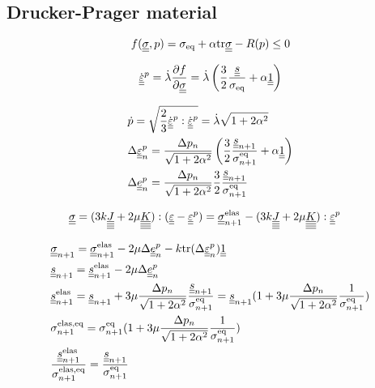 \documentclass[12pt]{article}
\begin{document}
\newpage
\begin{appendices}
    \section{Drucker-Prager material}

    \begin{equation}
        f(\uusigma, p) = \sigma_{\text{eq}} + \alpha \mtr \uusigma - R(p) \leq 0
    \end{equation}

    \begin{equation}
        \dot{\uueps}^p = \dot{\lambda} \frac{\partial f}{\partial \uusigma} = \dot{\lambda} \left(\frac{3}{2} \frac{\uus}{\sigma_\text{eq}} + \alpha \uuUnit \right)
    \end{equation}

    \begin{align}
        & \dot{p} = \sqrt{\frac{2}{3} \dot{\uueps}^p : \dot{\uueps}^p} = \dot{\lambda}\sqrt{1 + 2\alpha^2} \\
        & \Deltaepsp = \frac{\Delta p_n}{\sqrt{1 + 2\alpha^2}} \left( \frac{3}{2} \frac{\uusn}{\sigmaeqn} + \alpha \uuUnit \right) \\
        & \Deltaep = \frac{\Delta p_n}{\sqrt{1 + 2\alpha^2}} \frac{3}{2} \frac{\uusn}{\sigmaeqn} 
    \end{align}

    \begin{align}
        & \uusigma = (3k\uuuuJ + 2\mu\uuuuK) : (\uueps - \uueps^p) = \uusigma_{n+1}^\text{elas} - (3k\uuuuJ + 2\mu\uuuuK) : \uueps^p
    \end{align}

    \begin{align}
        & \uusigma_{n+1} = \uusigma_{n+1}^\text{elas} - 2\mu \Deltaep - k \mtr (\Deltaepsp) \uuUnit \\
        & \uus_{n+1} = \uus_{n+1}^\text{elas} - 2\mu\Deltaep \\
        & \uus_{n+1}^\text{elas} = \uus_{n+1} + 3\mu\frac{\Delta p_n}{\sqrt{1 + 2\alpha^2}} \frac{\uusn}{\sigmaeqn} = \uus_{n+1} (1 +  3\mu\frac{\Delta p_n}{\sqrt{1 + 2\alpha^2}} \frac{1}{\sigmaeqn}) \\
        & \sigmaeqnelas = \sigmaeqn (1 +  3\mu\frac{\Delta p_n}{\sqrt{1 + 2\alpha^2}} \frac{1}{\sigmaeqn}) \\
        & \frac{\uusnelas}{\sigmaeqnelas} = \frac{\uusn}{\sigmaeqn}
    \end{align}


\end{appendices}
\end{document}
